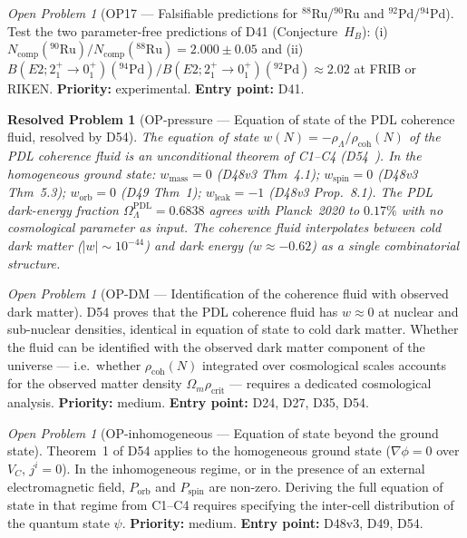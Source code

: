 \documentclass[11pt,a4paper]{article}
\newtheorem{resolvedproblem}{Resolved Problem}
\theoremstyle{plain}
\theoremstyle{definition}
\theoremstyle{remark}
\newtheorem{openproblem}[theorem]{Open Problem}
\newcommand{\rhocoh}{\rho_{\mathrm{coh}}}
\begin{document}
\begin{openproblem}[OP17 --- Falsifiable predictions for $^{88}$Ru/$^{90}$Ru and $^{92}$Pd/$^{94}$Pd]
\label{op:FRIB}
Test the two parameter-free predictions of D41 (Conjecture~$H_B$): (i) $N_{\mathrm{comp}}(^{90}\mathrm{Ru})/N_{\mathrm{comp}}(^{88}\mathrm{Ru})=2.000\pm0.05$ and (ii) $B(E2;2^+_1\!\to\!0^+_1)(^{94}\mathrm{Pd})/B(E2;2^+_1\!\to\!0^+_1)(^{92}\mathrm{Pd})\approx 2.02$ at FRIB or RIKEN. \textbf{Priority:} experimental. \textbf{Entry point:} D41.
\end{openproblem}

\begin{resolvedproblem}[OP-pressure --- Equation of state of the PDL coherence fluid, resolved by D54]
\label{op:pressure}
The equation of state $w(N) = -\rho_\Lambda/\rhocoh(N)$ of the PDL coherence fluid is an unconditional theorem of C1--C4 (D54~\cite{D54}). In the homogeneous ground state: $w_{\mathrm{mass}} = 0$ (D48v3 Thm~4.1); $w_{\mathrm{spin}} = 0$ (D48v3 Thm~5.3); $w_{\mathrm{orb}} = 0$ (D49 Thm~1); $w_{\mathrm{leak}} = -1$ (D48v3 Prop.~8.1). The PDL dark-energy fraction $\Omega_\Lambda^{\mathrm{PDL}} = 0.6838$ agrees with Planck~2020 to $0.17\%$ with no cosmological parameter as input. The coherence fluid interpolates between cold dark matter ($|w| \sim 10^{-44}$) and dark energy ($w \approx -0.62$) as a single combinatorial structure.
\end{resolvedproblem}

\begin{openproblem}[OP-DM --- Identification of the coherence fluid with observed dark matter]
\label{op:DM}
D54 proves that the PDL coherence fluid has $w \approx 0$ at nuclear and sub-nuclear densities, identical in equation of state to cold dark matter. Whether the fluid can be identified with the observed dark matter component of the universe --- i.e.\ whether $\rhocoh(N)$ integrated over cosmological scales accounts for the observed matter density $\Omega_m \rho_{\mathrm{crit}}$ --- requires a dedicated cosmological analysis. \textbf{Priority:} medium. \textbf{Entry point:} D24, D27, D35, D54.
\end{openproblem}

\begin{openproblem}[OP-inhomogeneous --- Equation of state beyond the ground state]
\label{op:inhomogeneous}
Theorem~1 of D54 applies to the homogeneous ground state ($\nabla\phi = 0$ over $V_C$, $j^i = 0$). In the inhomogeneous regime, or in the presence of an external electromagnetic field, $P_{\mathrm{orb}}$ and $P_{\mathrm{spin}}$ are non-zero. Deriving the full equation of state in that regime from C1--C4 requires specifying the inter-cell distribution of the quantum state $\psi$. \textbf{Priority:} medium. \textbf{Entry point:} D48v3, D49, D54.
\end{openproblem}
\end{document}
